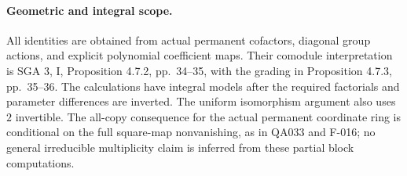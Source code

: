 \paragraph{Geometric and integral scope.}
All identities are obtained from actual permanent
cofactors, diagonal group actions, and explicit
polynomial coefficient maps. Their comodule
interpretation is SGA 3, I, Proposition 4.7.2,
pp.~34--35, with the grading in Proposition 4.7.3,
pp.~35--36. The calculations have integral models
after the required factorials and parameter
differences are inverted. The uniform isomorphism
argument also uses \(2\) invertible. The all-copy
consequence for the actual permanent coordinate ring
is conditional on the full square-map nonvanishing,
as in QA033 and F-016; no general irreducible
multiplicity claim is inferred from these partial
block computations.

